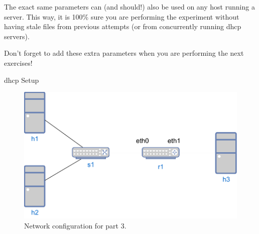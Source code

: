 \remark The exact same parameters can (and should!) also be used on any host running a  server. This way, it is 100\% sure you are performing the experiment without having stale files from previous attempts (or from concurrently running dhcp servers).

\remark Don't forget to add these extra parameters when you are performing the next exercises!

\begin{exercise}{\ac{dhcp} Setup}
	\begin{figure}[ht]
		\centering
		\includegraphics[width=.6\linewidth]{graphics/Lab3-Network3}	
		\caption{Network configuration for part 3.}
		\label{fig:lab3-network3}
	\end{figure}
	

\end{exercise}
